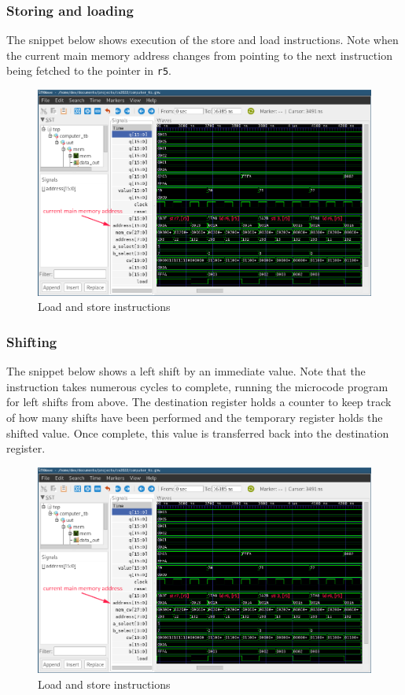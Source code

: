 \documentclass[a4paper]{article}
\numberwithin{figure}{section}
\numberwithin{table}{section}
\newcommand{\mi}{\mintinline}
\begin{document}
\newpage
\subsubsection{Storing and loading}
The snippet below shows execution of the store and load instructions. Note when the current main memory address 
changes from pointing to the next instruction being fetched to the pointer in \mi{c}{r5}.
\begin{figure}[h!]
	\centering
	\includegraphics[width=\textwidth]{store_load}
	\caption{Load and store instructions}
\end{figure}

\newpage
\subsubsection{Shifting}
The snippet below shows a left shift by an immediate value. Note that the instruction takes numerous cycles to 
complete, running the microcode program for left shifts from above. The destination 
register holds a counter to keep track of how many shifts have been performed and the temporary register holds 
the shifted value. Once complete, this value is transferred back into the destination register.
\begin{figure}[h!]
	\centering
	\includegraphics[width=\textwidth]{store_load}
	\caption{Load and store instructions}
\end{figure}
\end{document}
